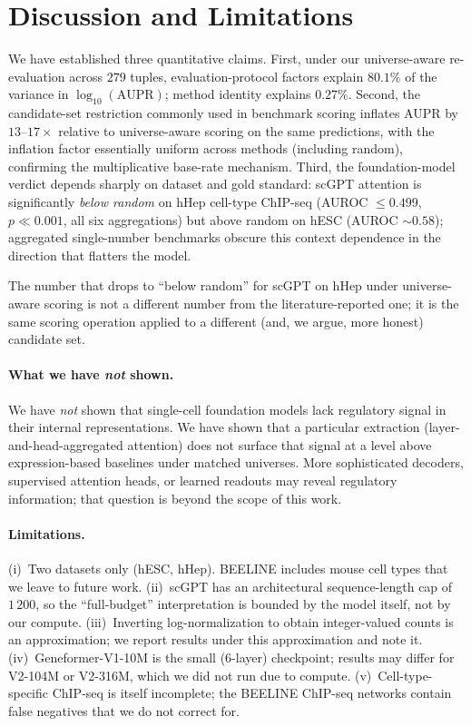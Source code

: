 \documentclass[sigconf]{acmart}
\begin{document}
\section{Discussion and Limitations}
\label{sec:discussion}

We have established three quantitative claims. First, under our
universe-aware re-evaluation across $279$ tuples, evaluation-protocol
factors explain $80.1\%$ of the variance in $\log_{10}(\text{AUPR})$;
method identity explains $0.27\%$. Second, the candidate-set
restriction commonly used in benchmark scoring inflates AUPR by
$13\text{--}17\times$ relative to universe-aware scoring on the
same predictions, with the inflation factor essentially uniform
across methods (including random), confirming the multiplicative
base-rate mechanism. Third, the foundation-model verdict depends
sharply on dataset and gold standard: scGPT attention is significantly
\emph{below random} on hHep cell-type ChIP-seq (AUROC $\le 0.499$,
$p \ll 0.001$, all six aggregations) but above random on hESC
(AUROC $\sim 0.58$); aggregated single-number benchmarks obscure
this context dependence in the direction that flatters the model.

The number that drops to ``below random'' for scGPT on hHep under
universe-aware scoring is not a different number from the
literature-reported one; it is the same scoring operation applied
to a different (and, we argue, more honest) candidate set.

\paragraph{What we have \emph{not} shown.} We have \emph{not} shown
that single-cell foundation models lack regulatory signal in their
internal representations. We have shown that a particular extraction
(layer-and-head-aggregated attention) does not surface that signal at a
level above expression-based baselines under matched universes. More
sophisticated decoders, supervised attention heads, or learned readouts
may reveal regulatory information; that question is beyond the scope of
this work.

\paragraph{Limitations.}
(i)~Two datasets only (hESC, hHep). BEELINE includes mouse cell types
that we leave to future work.
(ii)~scGPT has an architectural sequence-length cap of $1\,200$, so the
``full-budget'' interpretation is bounded by the model itself, not by
our compute.
(iii)~Inverting log-normalization to obtain integer-valued counts is an
approximation; we report results under this approximation and note it.
(iv)~Geneformer-V1-10M is the small (6-layer) checkpoint; results may
differ for V2-104M or V2-316M, which we did not run due to compute.
(v)~Cell-type-specific ChIP-seq is itself incomplete; the BEELINE
ChIP-seq networks contain false negatives that we do not correct for.
\end{document}
